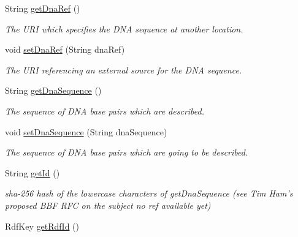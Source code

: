 \begin{DoxyCompactItemize}
\item 
String \hyperlink{classorg_1_1sbolstandard_1_1lib_s_b_o_lj_1_1_dna_sequence_ab525992d4a00fe98e4e039133eb452d0}{getDnaRef} ()
\begin{DoxyCompactList}\small\item\em The URI which specifies the DNA sequence at another location. \item\end{DoxyCompactList}\item 
void \hyperlink{classorg_1_1sbolstandard_1_1lib_s_b_o_lj_1_1_dna_sequence_a26f6b6be5be655740acd08158f7de7a6}{setDnaRef} (String dnaRef)
\begin{DoxyCompactList}\small\item\em The URI referencing an external source for the DNA sequence. \item\end{DoxyCompactList}\item 
String \hyperlink{classorg_1_1sbolstandard_1_1lib_s_b_o_lj_1_1_dna_sequence_acda4062f1d8040747df569d99b672270}{getDnaSequence} ()
\begin{DoxyCompactList}\small\item\em The sequence of DNA base pairs which are described. \item\end{DoxyCompactList}\item 
void \hyperlink{classorg_1_1sbolstandard_1_1lib_s_b_o_lj_1_1_dna_sequence_a3da557b5c417882926768fab89891e16}{setDnaSequence} (String dnaSequence)
\begin{DoxyCompactList}\small\item\em The sequence of DNA base pairs which are going to be described. \item\end{DoxyCompactList}\item 
String \hyperlink{classorg_1_1sbolstandard_1_1lib_s_b_o_lj_1_1_dna_sequence_a48539a5f3bd987989f8f49ea9687d2cc}{getId} ()
\begin{DoxyCompactList}\small\item\em sha-\/256 hash of the lowercase characters of getDnaSequence (see Tim Ham's proposed BBF RFC on the subject no ref available yet) \item\end{DoxyCompactList}\item 
RdfKey \hyperlink{classorg_1_1sbolstandard_1_1lib_s_b_o_lj_1_1_dna_sequence_aed64ecd5e0d01b67901f2fc0fd28dd90}{getRdfId} ()

\end{DoxyCompactItemize}
